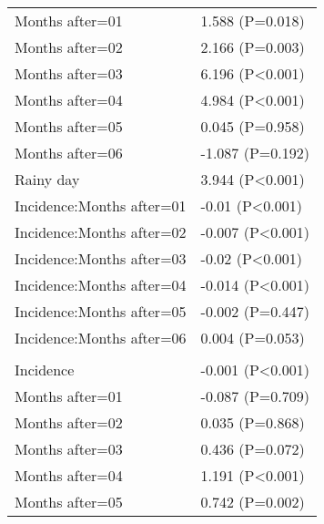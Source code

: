\documentclass[]{article}
\begin{document}
\begin{longtable}[t]{ll}
\hspace{1em}Months after=01 & 1.588 (P=0.018)\\
\hspace{1em}Months after=02 & 2.166 (P=0.003)\\
\hspace{1em}Months after=03 & 6.196 (P<0.001)\\
\hspace{1em}Months after=04 & 4.984 (P<0.001)\\
\hspace{1em}Months after=05 & 0.045 (P=0.958)\\
\hspace{1em}Months after=06 & -1.087 (P=0.192)\\
\hspace{1em}Rainy day & 3.944 (P<0.001)\\
\hspace{1em}Incidence:Months after=01 & -0.01 (P<0.001)\\
\hspace{1em}Incidence:Months after=02 & -0.007 (P<0.001)\\
\hspace{1em}Incidence:Months after=03 & -0.02 (P<0.001)\\
\hspace{1em}Incidence:Months after=04 & -0.014 (P<0.001)\\
\hspace{1em}Incidence:Months after=05 & -0.002 (P=0.447)\\
\hspace{1em}Incidence:Months after=06 & 0.004 (P=0.053)\\
\addlinespace[1.5em]
\multicolumn{2}{l}{\textbf{Temporary field worker}}\\
\hspace{1em}Incidence & -0.001 (P<0.001)\\
\hspace{1em}Months after=01 & -0.087 (P=0.709)\\
\hspace{1em}Months after=02 & 0.035 (P=0.868)\\
\hspace{1em}Months after=03 & 0.436 (P=0.072)\\
\hspace{1em}Months after=04 & 1.191 (P<0.001)\\
\hspace{1em}Months after=05 & 0.742 (P=0.002)\\

\end{longtable}
\end{document}

